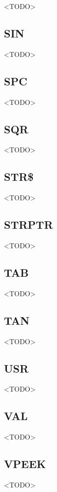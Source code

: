 <TODO>

\subsection{SIN}

<TODO>

\subsection{SPC}

<TODO>

\subsection{SQR}

<TODO>

\subsection{STR\$}

<TODO>

\subsection{STRPTR}

<TODO>

\subsection{TAB}

<TODO>

\subsection{TAN}

<TODO>

\subsection{USR}

<TODO>

\subsection{VAL}

<TODO>

\subsection{VPEEK}

<TODO>

